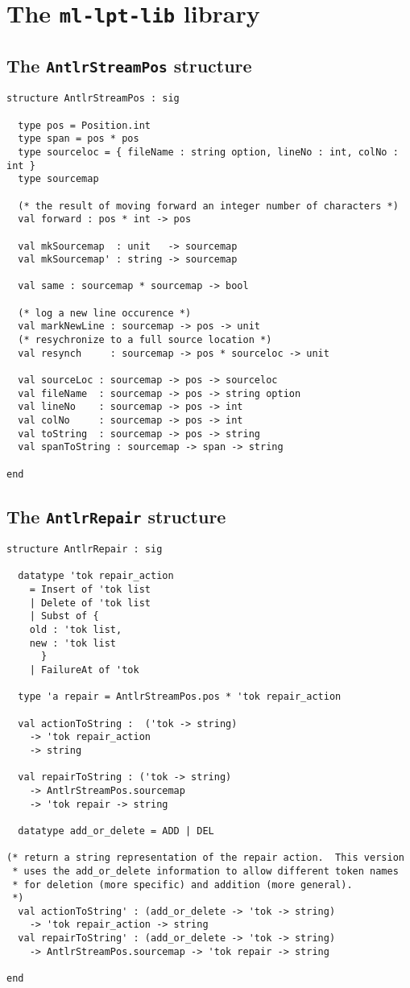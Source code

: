 %
\chapter{The {\tt ml-lpt-lib} library}
\label{ch:ml-lpt-lib}


\section{The {\tt AntlrStreamPos} structure}

\begin{lstlisting}
structure AntlrStreamPos : sig

  type pos = Position.int
  type span = pos * pos
  type sourceloc = { fileName : string option, lineNo : int, colNo : int }
  type sourcemap

  (* the result of moving forward an integer number of characters *)
  val forward : pos * int -> pos

  val mkSourcemap  : unit   -> sourcemap
  val mkSourcemap' : string -> sourcemap

  val same : sourcemap * sourcemap -> bool

  (* log a new line occurence *)
  val markNewLine : sourcemap -> pos -> unit
  (* resychronize to a full source location *)
  val resynch     : sourcemap -> pos * sourceloc -> unit

  val sourceLoc : sourcemap -> pos -> sourceloc
  val fileName  : sourcemap -> pos -> string option
  val lineNo    : sourcemap -> pos -> int
  val colNo     : sourcemap -> pos -> int
  val toString  : sourcemap -> pos -> string
  val spanToString : sourcemap -> span -> string

end
\end{lstlisting}%


\section{The {\tt AntlrRepair} structure}

\begin{lstlisting}
structure AntlrRepair : sig

  datatype 'tok repair_action
    = Insert of 'tok list
    | Delete of 'tok list
    | Subst of {
	old : 'tok list,
	new : 'tok list
      }
    | FailureAt of 'tok
  
  type 'a repair = AntlrStreamPos.pos * 'tok repair_action
  
  val actionToString :  ('tok -> string)
	-> 'tok repair_action
	-> string
    
  val repairToString : ('tok -> string)
	-> AntlrStreamPos.sourcemap
	-> 'tok repair -> string

  datatype add_or_delete = ADD | DEL

(* return a string representation of the repair action.  This version
 * uses the add_or_delete information to allow different token names
 * for deletion (more specific) and addition (more general).
 *)
  val actionToString' : (add_or_delete -> 'tok -> string)
	-> 'tok repair_action -> string
  val repairToString' : (add_or_delete -> 'tok -> string)
	-> AntlrStreamPos.sourcemap -> 'tok repair -> string

end
\end{lstlisting}%
